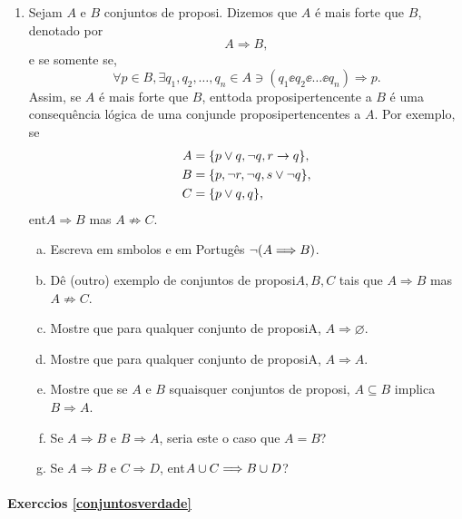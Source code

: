\begin{enumerate}[{\bf 1.}]
\item Sejam $A$ e $B$ conjuntos de proposi\cois. Dizemos que $A$ \'e mais forte que $B$, denotado por
\[
A\Longrightarrow B,
\]
e se somente se,
\[
\forall p\in B,\exists q_1,q_2,\ldots,q_n \in A \ni (q_1\ee q_2\ee \ldots \ee q_n)\Rightarrow p.
\]
Assim, se $A$ \'e mais forte que $B$, ent\ao toda proposi\cao pertencente a $B$ \'e uma consequ\^encia l\'ogica de uma conjun\cao de proposi\coes pertencentes a $A$. Por exemplo, se
\begin{equation*}
 \begin{aligned}
A&=\{p\vee q, \lnot q, r\to q\},\\
B&=\{p, \lnot r, \lnot q, s\vee\lnot q\},\\
C&=\{p\vee q,q\},
 \end{aligned}
\end{equation*}
ent\ao $A\Longrightarrow B$ mas $A\not\Longrightarrow C$.
\begin{enumerate}[a)]
\item Escreva em s\ih mbolos e em Portug\^es $\lnot(A\Longrightarrow B)$.
\item D\^e (outro) exemplo de conjuntos de proposi\coes $A,B,C$ tais que $A\Longrightarrow B$ mas $A\not\Longrightarrow C$. 
\item Mostre que para qualquer conjunto de proposi\coes A, $A\Longrightarrow \varnothing$.
\item Mostre que para qualquer conjunto de proposi\coes A, $A\Longrightarrow A$.
\item Mostre que se $A$ e $B$ s\ao quaisquer conjuntos de proposi\cois, $A\subseteq B$ implica $B\Longrightarrow A$.
\item Se $A\Longrightarrow B$ e $B\Longrightarrow A$, seria este o caso que $A=B$?
\item Se $A \Longrightarrow B$ e $C\Longrightarrow D$, ent\ao $A\cup C\Longrightarrow B\cup D$?
\end{enumerate}
\end{enumerate}
\paragraph{Exerc\ih cios \ref{conjuntosverdade}}

